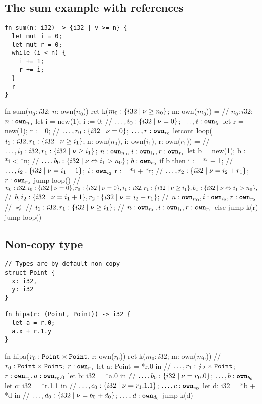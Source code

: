\documentclass{article}
\begin{document}
\subsection{The sum example with references}
\begin{verbatim}
fn sum(n: i32) -> {i32 | v >= n} {
  let mut i = 0;
  let mut r = 0;
  while (i < n) {
    i += 1;
    r += i;
  }
  r
}
\end{verbatim}

\begin{lambdalr}
fn sum($n_0: i32$; $n$: own($n_0$)) ret k($m_0: \r{i32 | \nu \geq n_0}$; m: own($m_0$)) =
  // $n_0: i32$; $n: \text{\ttfamily \bfseries own}_{n_0}$
  let i = new(1);
  i := 0;           // $\dots, i_0:\r{i32 | \nu = 0}$; $\dots, i:\text{\ttfamily \bfseries own}_{i_0}$
  let r = new(1);
  r := 0;           // $\dots, r_0:\r{i32 | \nu = 0}$; $\dots, r:\text{\ttfamily \bfseries own}_{r_0}$
  letcont loop($i_1: i32, r_1: \r{i32 | \nu \geq i_1}$; n: own($n_0$), i: own($i_1$), r: own($r_1$)) =
    // $\dots, i_1: i32, r_1:\r{i32 | \nu \geq i_1}$; $n: \text{\ttfamily \bfseries own}_{n_0}, i: \text{\ttfamily \bfseries own}_{i_1}, r: \text{\ttfamily \bfseries own}_{r_1}$
    let b = new(1);
    b := *i < *n;   // $\dots, b_0:\r{i32|\nu \Leftrightarrow i_1 > n_0}$; $b: \text{\ttfamily \bfseries own}_{b_0}$
    if b then
      i := *i + 1;  // $\dots, i_2:\r{i32 | \nu = i_1 + 1}$; $i: \text{\ttfamily \bfseries own}_{i_2}$
      r := *i + *r; // $\dots, r_2:\r{i32 | \nu = i_2 + r_1}$; $r: \text{\ttfamily \bfseries own}_{r_2}$
      jump loop()
        // $n_0: i32, i_0:\r{i32 | \nu = 0},r_0:\r{i32 | \nu=0}, i_1: i32, r_1:\r{i32 | \nu \geq i_1},b_0:\r{i32|\nu \Leftrightarrow i_1 > n_0},$
        // $b, i_2:\r{i32 | \nu = i_1 + 1}, r_2:\r{i32 | \nu = i_2 + r_1}$;
        // $n:\text{\ttfamily \bfseries own}_{n_0}, i:\text{\ttfamily \bfseries own}_{i_2}, r:\text{\ttfamily \bfseries own}_{r_2}$
        // $\preceq$
        // $i_1: i32, r_1 : \r{i32 | \nu \geq i_1}$;
        // $n: \text{\ttfamily \bfseries own}_{n_0}, i:\text{\ttfamily \bfseries own}_{i_1}, r:\text{\ttfamily \bfseries own}_{r_1}$
    else
      jump k(r)
  jump loop()
\end{lambdalr}

\clearpage
\subsection{Non-copy type}
\begin{verbatim}
// Types are by default non-copy
struct Point {
  x: i32,
  y: i32
}

fn hipa(r: (Point, Point)) -> i32 {
  let a = r.0;
  a.x + r.1.y
}
\end{verbatim}

\begin{lambdalr}
fn hipa($r_0: \verb|Point|\times\verb|Point|$, r: own($r_0$)) ret k($m_0: i32$; m: own($m_0$))
  // $r_0: \verb|Point|\times\verb|Point|$; $r: \text{\ttfamily \bfseries own}_{r_0}$
  let a: Point = *r.0 in  // $\dots, r_1:\lightning_2\times \verb|Point|$; $r: \text{\ttfamily \bfseries own}_{r_1}, a:\text{\ttfamily \bfseries own}_{r_0.0}$
  let b: i32 = *a.0 in    // $\dots, b_0:\r{i32 | \nu = r_0.0}$; $\dots, b: \text{\ttfamily \bfseries own}_{b_0}$
  let c: i32 = *r.1.1 in  // $\dots, c_0:\r{i32 | \nu = r_1.1.1}$; $\dots,c: \text{\ttfamily \bfseries own}_{c_0}$
  let d: i32 = *b + *d in // $\dots, d_0:\r{i32 | \nu = b_0 + d_0}$; $\dots, d: \text{\ttfamily \bfseries own}_{d_0}$
  jump k(d)
\end{lambdalr}
\end{document}
